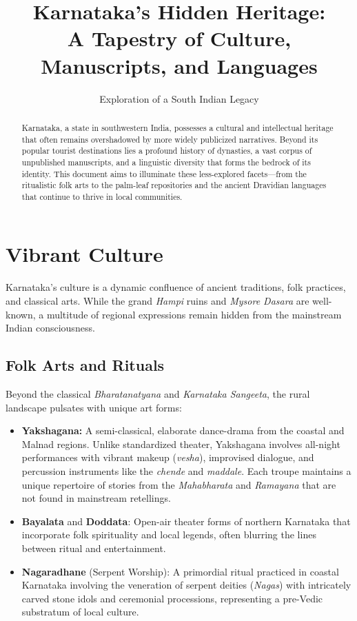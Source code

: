 \documentclass[12pt]{article}
\title{\textbf{Karnataka's Hidden Heritage:}\\
A Tapestry of Culture, Manuscripts, and Languages}
\author{Exploration of a South Indian Legacy}
\date{}
\begin{document}
\maketitle

\begin{abstract}
\noindent
Karnataka, a state in southwestern India, possesses a cultural and intellectual heritage that often remains overshadowed by more widely publicized narratives. Beyond its popular tourist destinations lies a profound history of dynasties, a vast corpus of unpublished manuscripts, and a linguistic diversity that forms the bedrock of its identity. This document aims to illuminate these less-explored facets—from the ritualistic folk arts to the palm-leaf repositories and the ancient Dravidian languages that continue to thrive in local communities.
\end{abstract}

\section{Vibrant Culture}
Karnataka’s culture is a dynamic confluence of ancient traditions, folk practices, and classical arts. While the grand \textit{Hampi} ruins and \textit{Mysore Dasara} are well-known, a multitude of regional expressions remain hidden from the mainstream Indian consciousness.

\subsection{Folk Arts and Rituals}
Beyond the classical \textit{Bharatanatyana} and \textit{Karnataka Sangeeta}, the rural landscape pulsates with unique art forms:
\begin{itemize}
    \item \textbf{Yakshagana:} A semi-classical, elaborate dance-drama from the coastal and Malnad regions. Unlike standardized theater, Yakshagana involves all-night performances with vibrant makeup (\textit{vesha}), improvised dialogue, and percussion instruments like the \textit{chende} and \textit{maddale}. Each troupe maintains a unique repertoire of stories from the \textit{Mahabharata} and \textit{Ramayana} that are not found in mainstream retellings.
    \item \textbf{Bayalata} and \textbf{Doddata}: Open-air theater forms of northern Karnataka that incorporate folk spirituality and local legends, often blurring the lines between ritual and entertainment.
    \item \textbf{Nagaradhane} (Serpent Worship): A primordial ritual practiced in coastal Karnataka involving the veneration of serpent deities (\textit{Nagas}) with intricately carved stone idols and ceremonial processions, representing a pre-Vedic substratum of local culture.
\end{itemize}
\end{document}
